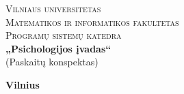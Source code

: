 \begin{titlepage}

  \begin{center}

    \textsc{\Large Vilniaus universitetas\\
    Matematikos ir informatikos fakultetas\\
    Programų sistemų katedra}\\[6.0cm]

    \textbf{ \LARGE „Psichologijos įvadas“ }\\
    { \Large (Paskaitų konspektas)}\\[0.5cm]

    \vfill

    \textbf{\large  Vilnius \\ \the\year }
  \end{center}
  
\end{titlepage}
